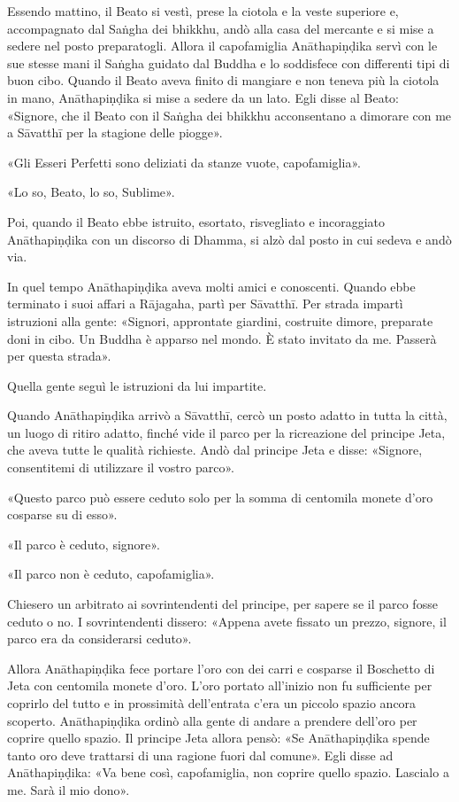 Essendo mattino, il Beato si vestì, prese la ciotola e la veste
superiore e, accompagnato dal Saṅgha dei bhikkhu, andò alla casa del
mercante e si mise a sedere nel posto preparatogli. Allora il
capofamiglia Anāthapiṇḍika servì con le sue stesse mani il Saṅgha
guidato dal Buddha e lo soddisfece con differenti tipi di buon cibo.
Quando il Beato aveva finito di mangiare e non teneva più la ciotola in
mano, Anāthapiṇḍika si mise a sedere da un lato. Egli disse al Beato:
«Signore, che il Beato con il Saṅgha dei bhikkhu acconsentano a dimorare
con me a Sāvatthī per la stagione delle piogge».


«Gli Esseri Perfetti sono deliziati da stanze vuote, capofamiglia».


«Lo so, Beato, lo so, Sublime».


Poi, quando il Beato ebbe istruito, esortato, risvegliato e incoraggiato
Anāthapiṇḍika con un discorso di Dhamma, si alzò dal posto in cui sedeva
e andò via.


In quel tempo Anāthapiṇḍika aveva molti amici e conoscenti. Quando ebbe
terminato i suoi affari a Rājagaha, partì per Sāvatthī. Per strada
impartì istruzioni alla gente: «Signori, approntate giardini, costruite
dimore, preparate doni in cibo. Un Buddha è apparso nel mondo. È stato
invitato da me. Passerà per questa strada».


Quella gente seguì le istruzioni da lui impartite.


Quando Anāthapiṇḍika arrivò a Sāvatthī, cercò un posto adatto in tutta
la città, un luogo di ritiro adatto, finché vide il parco per la
ricreazione del principe Jeta, che aveva tutte le qualità richieste.
Andò dal principe Jeta e disse: «Signore, consentitemi di utilizzare il
vostro parco».


«Questo parco può essere ceduto solo per la somma di centomila monete
d’oro cosparse su di esso».


«Il parco è ceduto, signore».


«Il parco non è ceduto, capofamiglia».


Chiesero un arbitrato ai sovrintendenti del principe, per sapere se il
parco fosse ceduto o no. I sovrintendenti dissero: «Appena avete fissato
un prezzo, signore, il parco era da considerarsi ceduto».


Allora Anāthapiṇḍika fece portare l’oro con dei carri e cosparse il
Boschetto di Jeta con centomila monete d’oro. L’oro portato all’inizio
non fu sufficiente per coprirlo del tutto e in prossimità dell’entrata
c’era un piccolo spazio ancora scoperto. Anāthapiṇḍika ordinò alla gente
di andare a prendere dell’oro per coprire quello spazio. Il principe
Jeta allora pensò: «Se Anāthapiṇḍika spende tanto oro deve trattarsi di
una ragione fuori dal comune». Egli disse ad Anāthapiṇḍika: «Va bene
così, capofamiglia, non coprire quello spazio. Lascialo a me. Sarà il
mio dono».


